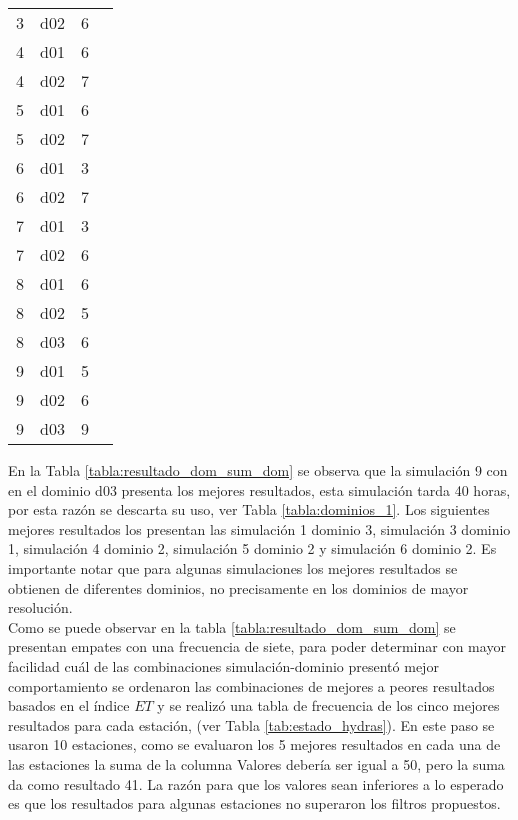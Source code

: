 \begin{table}[H]
\begin{tabular}{llrr}
3   &   d02 &      6 \\
4   &   d01 &      6 \\
4   &   d02 &      7 \\
5   &   d01 &      6 \\
5   &   d02 &      7 \\
6   &   d01 &      3 \\
6   &   d02 &      7 \\
7   &   d01 &      3 \\
7   &   d02 &      6 \\
8   &   d01 &      6 \\
8   &   d02 &      5 \\
8   &   d03 &      6 \\
9   &   d01 &      5 \\
9   &   d02 &      6 \\
9   &   d03 &      9 \\


 
\bottomrule
\end{tabular}
\end{table}

En la Tabla \ref{tabla:resultado_dom_sum_dom} se observa que la simulación 9 con en el dominio d03 presenta los mejores resultados, esta simulación tarda 40 horas, por esta razón se descarta su uso, ver Tabla \ref{tabla:dominios_1}. Los siguientes mejores resultados los presentan las simulación 1 dominio 3, simulación 3 dominio 1, simulación 4 dominio 2, simulación 5 dominio 2 y simulación 6 dominio 2. Es importante notar que para algunas simulaciones los mejores resultados se obtienen de diferentes dominios, no precisamente en los dominios de mayor resolución.\\ 

Como se puede observar en la tabla \ref{tabla:resultado_dom_sum_dom} se presentan empates con una frecuencia de siete, para poder determinar con mayor facilidad cuál de las combinaciones simulación-dominio presentó mejor comportamiento se ordenaron las combinaciones de mejores a peores resultados basados en el índice $ET$ y se realizó una tabla de frecuencia de los cinco mejores resultados para cada estación, (ver Tabla \ref{tab:estado_hydras}). En este paso se usaron 10 estaciones, como se evaluaron los 5 mejores resultados en cada una de las estaciones la suma de la columna Valores debería ser igual a 50, pero la suma da como resultado 41. La razón para que los valores sean inferiores a lo esperado es que los resultados para algunas estaciones no superaron los filtros propuestos.\\

